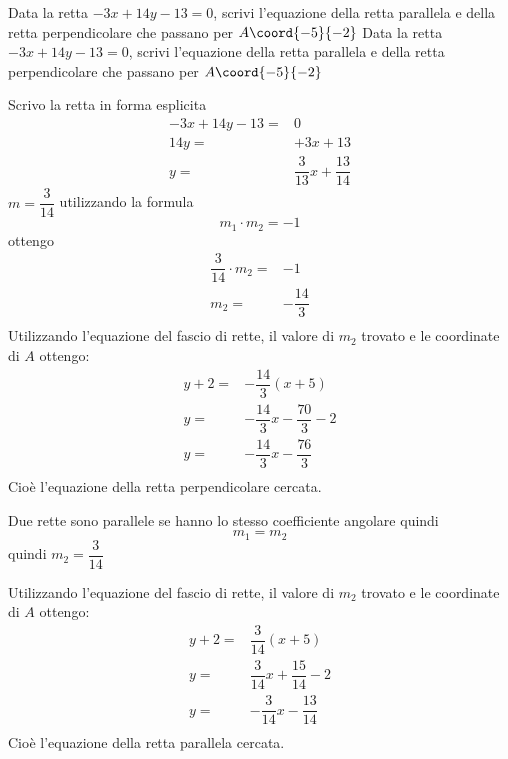 \begin{exercise}
	Data la retta $-3x+14y-13=0$, scrivi l'equazione della retta parallela e della retta perpendicolare che passano per  $A\coord{-5}{-2}$
	\tcblower
	Data la retta $-3x+14y-13=0$, scrivi l'equazione della retta parallela e della retta perpendicolare che passano per  $A\coord{-5}{-2}$
	
	Scrivo la retta in forma esplicita
	\begin{align*}
		-3x+14y-13=&0\\
		14y=&+3x+13\\
		y=&\dfrac{3}{13}x+\dfrac{13}{14}
	\end{align*}
	 	$m=\dfrac{3}{14}$ utilizzando la formula \[m_1\cdot m_2=-1\] ottengo
	 	\begin{align*}
	 		\dfrac{3}{14}\cdot m_2=&-1\\
	 		m_2=&-\dfrac{14}{3}\\
	 	\end{align*}
	 		Utilizzando l'equazione del fascio di rette, il valore di $m_2$ trovato e le coordinate di $A$ ottengo:
	 		\begin{align*}
	 			y+2=&-\dfrac{14}{3}(x+5)\\
	 			y=&-\dfrac{14}{3}x-\dfrac{70}{3}-2\\
	 			y=&-\dfrac{14}{3}x-\dfrac{76}{3}\\
	 		\end{align*}
	 		Cioè l'equazione della retta perpendicolare cercata.
	 		
	 		Due rette sono parallele se hanno lo stesso coefficiente angolare quindi \[m_1=m_2 \]
	 		quindi $m_2=\dfrac{3}{14}$ 
	 		
	 		Utilizzando l'equazione del fascio di rette, il valore di $m_2$ trovato e le coordinate di $A$ ottengo:
	 		\begin{align*}
	 			y+2=&\dfrac{3}{14}(x+5)\\
	 			y=&\dfrac{3}{14}x+\dfrac{15}{14}-2\\
	 			y=&-\dfrac{3}{14}x-\dfrac{13}{14}\\
	 		\end{align*}
	 		Cioè l'equazione della retta parallela cercata.
	 		
	 			\begin{center}
	 				
	 			\end{center}
\end{exercise}
